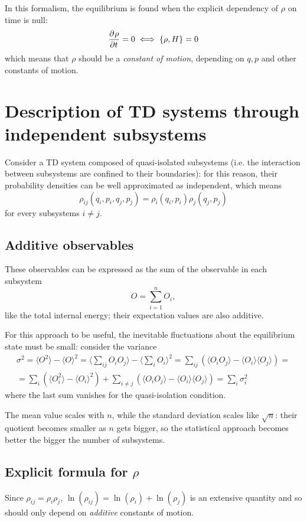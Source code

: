 
In this formalism, the equilibrium is found when the explicit dependency of $\rho$
on time is null:
$$\pdv[]{\rho}{t}=0 \iff \left\{\rho,H\right\}=0$$
which means that $\rho$ should be a \textit{constant of motion}, depending on
$q,p$ and other constants of motion.

\section{Description of TD systems through independent subsystems}
Consider a TD system composed of quasi-isolated subsystems (i.e. the interaction
between subsystems are confined to their boundaries): for this reason, their
probability densities can be well approximated as independent, which means
$$\rho_{ij}(q_i,p_i,q_j,p_j) = \rho_i(q_i,p_i)\rho_j(q_j,p_j)$$
for every subsystems $i\neq j$.
\subsection{Additive observables}
These observables can be expressed as the sum of the observable in each subsystem
$$O = \sum_{i=1}^{n}O_i,$$
like the total internal energy; their expectation values are also additive.

For this approach to be useful, the inevitable fluctuations about the equilibrium
state must be small: consider the variance
\begin{gather*}
\sigma^2 = \langle O^2\rangle-\langle O\rangle^2 = \langle\sum_{ij}^{}O_iO_j
\rangle - \langle\sum_{i}^{}O_i\rangle^2 = \sum_{ij}^{}\left(
\langle O_iO_j\rangle - \langle O_i\rangle\langle O_j\rangle\right) =\\=
\sum_{i}^{}\left(\langle O_i^2\rangle-\langle O_i\rangle^2\right) +
\sum_{i\neq j}^{}\left(\langle O_iO_j\rangle - \langle O_i\rangle\langle O_j\rangle
\right) = \sum_{i}^{}\sigma^2_i
\end{gather*}
where the last sum vanishes for the quasi-isolation condition.

The mean value scales with $n$, while the standard deviation scales like
$\sqrt{n}$: their quotient becomes smaller as $n$ gets bigger, so the statistical
approach becomes better the bigger the number of subsystems.
\subsection{Explicit formula for $\rho$}
Since $\rho_{ij} = \rho_i\rho_j$, $\ln(\rho_{ij}) = \ln(\rho_i)+\ln(\rho_j)$ is
an extensive quantity and so should only depend on \textit{additive} constants
of motion.

